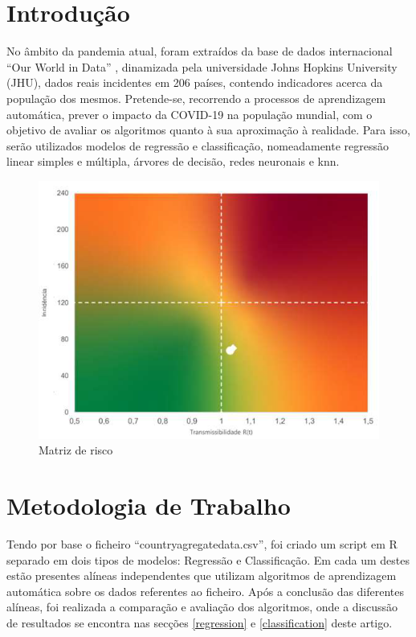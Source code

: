 \documentclass[conference]{IEEEtran}
\begin{document}
\section{Introdução} %
No âmbito da pandemia atual, foram extraídos da base de dados internacional “Our World in Data” \cite{database}, dinamizada pela universidade Johns Hopkins University (JHU), dados reais incidentes em 206 países, contendo indicadores acerca da população dos mesmos. 
Pretende-se, recorrendo a processos de aprendizagem automática, prever o impacto da COVID-19 na população mundial, com o objetivo de avaliar os algoritmos quanto à sua aproximação à realidade. Para isso, serão utilizados modelos de regressão e classificação, nomeadamente regressão linear simples e múltipla, árvores de decisão, redes neuronais e knn.
\begin{figure}[htbp]
\centerline{\includegraphics[width=0.95\columnwidth]{images/matrix.png}}
\caption{Matriz de risco}
\label{matrix}
\end{figure}



\section{Metodologia de Trabalho}
\label{methodology} %
Tendo por base o ficheiro “countryagregatedata.csv”\cite{dataFile}, foi criado um script em R separado em dois tipos de modelos: Regressão e Classificação. Em cada um destes estão presentes alíneas independentes que utilizam algoritmos de aprendizagem automática sobre os dados referentes ao ficheiro. Após a conclusão das diferentes alíneas, foi realizada a comparação e avaliação dos algoritmos, onde a discussão de resultados se encontra nas secções \ref{regression} e \ref{classification} deste artigo. 
\end{document}
